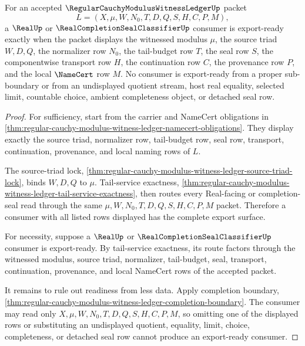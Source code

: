 \begin{theorem}
\label{thm:regular-cauchy-modulus-witness-ledger-real-seal-export-readiness}
For an accepted $\RegularCauchyModulusWitnessLedgerUp$ packet
$$
L=(X,\mu,W,N_0,T,D,Q,S,H,C,P,M),
$$
a $\RealUp$ or $\RealCompletionSealClassifierUp$ consumer is export-ready exactly when the packet displays the witnessed modulus $\mu$, the source triad $W,D,Q$, the normalizer row $N_0$, the tail-budget row $T$, the seal row $S$, the componentwise transport row $H$, the continuation row $C$, the provenance row $P$, and the local $\NameCert$ row $M$. No consumer is export-ready from a proper sub-boundary or from an undisplayed quotient stream, host real equality, selected limit, countable choice, ambient completeness object, or detached seal row.
\end{theorem}
\begin{proof}
For sufficiency, start from the carrier and NameCert obligations in \autoref{thm:regular-cauchy-modulus-witness-ledger-namecert-obligations}. They display exactly the source triad, normalizer row, tail-budget row, seal row, transport, continuation, provenance, and local naming rows of $L$.

The source-triad lock, \autoref{thm:regular-cauchy-modulus-witness-ledger-source-triad-lock}, binds $W,D,Q$ to $\mu$. Tail-service exactness, \autoref{thm:regular-cauchy-modulus-witness-ledger-tail-service-exactness}, then routes every Real-facing or completion-seal read through the same $\mu,W,N_0,T,D,Q,S,H,C,P,M$ packet. Therefore a consumer with all listed rows displayed has the complete export surface.

For necessity, suppose a $\RealUp$ or $\RealCompletionSealClassifierUp$ consumer is export-ready. By tail-service exactness, its route factors through the witnessed modulus, source triad, normalizer, tail-budget, seal, transport, continuation, provenance, and local NameCert rows of the accepted packet.

It remains to rule out readiness from less data. Apply completion boundary, \autoref{thm:regular-cauchy-modulus-witness-ledger-completion-boundary}. The consumer may read only $X,\mu,W,N_0,T,D,Q,S,H,C,P,M$, so omitting one of the displayed rows or substituting an undisplayed quotient, equality, limit, choice, completeness, or detached seal row cannot produce an export-ready consumer.
\end{proof}

